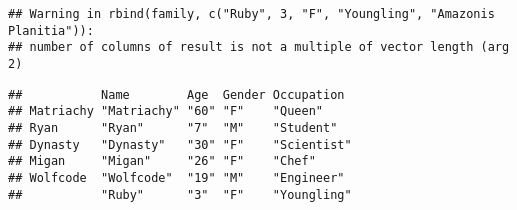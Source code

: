 \documentclass[
]{article}
\begin{document}
\begin{verbatim}
## Warning in rbind(family, c("Ruby", 3, "F", "Youngling", "Amazonis Planitia")):
## number of columns of result is not a multiple of vector length (arg 2)
\end{verbatim}

\begin{verbatim}
##           Name        Age  Gender Occupation 
## Matriachy "Matriachy" "60" "F"    "Queen"    
## Ryan      "Ryan"      "7"  "M"    "Student"  
## Dynasty   "Dynasty"   "30" "F"    "Scientist"
## Migan     "Migan"     "26" "F"    "Chef"     
## Wolfcode  "Wolfcode"  "19" "M"    "Engineer" 
##           "Ruby"      "3"  "F"    "Youngling"
\end{verbatim}
\end{document}

